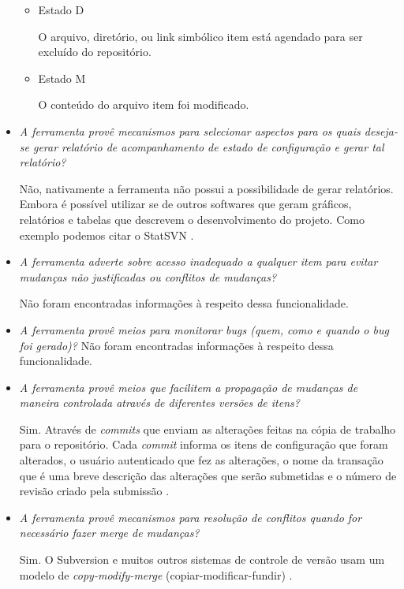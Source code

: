 \begin{itemize}
\begin{itemize}
          \item Estado D

          O arquivo, diretório, ou link simbólico item está agendado para ser excluído do repositório.

          \item Estado M

          O conteúdo do arquivo item foi modificado.
        \end{itemize}

  \item \textit{A ferramenta provê mecanismos para selecionar aspectos para os quais deseja-se gerar relatório
  de acompanhamento de estado de configuração e gerar tal relatório?}

      Não, nativamente a ferramenta não possui a possibilidade de gerar relatórios. Embora é possível utilizar se de outros softwares que geram gráficos, relatórios e tabelas que descrevem o desenvolvimento do projeto. Como exemplo podemos citar o StatSVN \footnotemark. 

  \item \textit{A ferramenta adverte sobre acesso inadequado a qualquer item para evitar mudanças não justificadas
  ou conflitos de mudanças?}
  
  Não foram encontradas informações à respeito dessa funcionalidade.
  
  \item \textit{A ferramenta provê meios para monitorar bugs (quem, como e quando o bug foi gerado)?}
  Não foram encontradas informações à respeito dessa funcionalidade.
  
  \item \textit{A ferramenta provê meios que facilitem a propagação de mudanças de maneira controlada
  através de diferentes versões de itens?}
  
  Sim. Através de \textit{commits} que enviam as alterações feitas na cópia de trabalho para o repositório. Cada \textit{commit} 
  informa os itens de configuração que foram alterados, o usuário autenticado que fez as alterações, o nome da transação que é uma breve descrição
  das alterações que serão submetidas e o número de revisão criado pela submissão \cite{svn-book}.
  
  \item \textit{A ferramenta provê mecanismos para resolução de conflitos quando for necessário fazer merge
  de mudanças?}
  
  Sim. O Subversion e muitos outros sistemas de controle de versão usam um modelo de \textit{copy-modify-merge} (copiar-modificar-fundir) \cite{svn-book}. 
  

\end{itemize}
